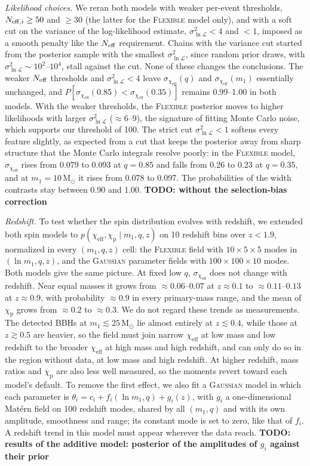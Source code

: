 \documentclass[%
 onecolumn,
 amsmath,amssymb,
 aps,
 prl,
 nofootinbib,nobibnotes,
]{revtex4-2}
\newcommand{\Msun}{\ensuremath{\mathrm{M}_{\odot}}}
\newcommand{\chieff}{\ensuremath{\chi_{\mathrm{eff}}}}
\newcommand{\chip}{\ensuremath{\chi_{\mathrm{p}}}}
\newcommand{\todo}[1]{{\color{Blue}\bf TODO: #1}}
\newcommand{\flexiblespins}{\textsc{Flexible}\xspace}
\newcommand{\gaussianspins}{\textsc{Gaussian}\xspace}
\begin{document}
\textit{Likelihood choices.} We reran both models with weaker per-event thresholds, $N_{{\rm eff}, i} \geq 50$ and $\geq 30$ (the latter for the \flexiblespins model only), and with a soft cut on the variance of the log-likelihood estimate, $\sigma^2_{\ln\mathcal{L}} < 4$ and $< 1$, imposed as a smooth penalty like the $N_{\rm eff}$ requirement. Chains with the variance cut started from the posterior sample with the smallest $\sigma^2_{\ln\mathcal{L}}$, since random prior draws, with $\sigma^2_{\ln\mathcal{L}} \sim 10^2$--$10^4$, stall against the cut. None of these changes the conclusions. The weaker $N_{\rm eff}$ thresholds and $\sigma^2_{\ln\mathcal{L}} < 4$ leave $\sigma_{\chieff}(q)$ and $\sigma_{\chieff}(m_1)$ essentially unchanged, and $P[\sigma_{\chieff}(0.85) < \sigma_{\chieff}(0.35)]$ remains 0.99--1.00 in both models. With the weaker thresholds, the \flexiblespins posterior moves to higher likelihoods with larger $\sigma^2_{\ln\mathcal{L}}$ ($\approx 6$--9), the signature of fitting Monte Carlo noise, which supports our threshold of 100. The strict cut $\sigma^2_{\ln\mathcal{L}} < 1$ softens every feature slightly, as expected from a cut that keeps the posterior away from sharp structure that the Monte Carlo integrals resolve poorly: in the \flexiblespins model, $\sigma_{\chieff}$ rises from 0.079 to 0.093 at $q = 0.85$ and falls from 0.26 to 0.23 at $q = 0.35$, and at $m_1 = 10\,\Msun$ it rises from 0.078 to 0.097. The probabilities of the width contrasts stay between 0.90 and 1.00. \todo{without the selection-bias correction}

\textit{Redshift.} To test whether the spin distribution evolves with redshift, we extended both spin models to $p(\chieff, \chip \mid m_1, q, z)$ on 10 redshift bins over $z < 1.9$, normalized in every $(m_1, q, z)$ cell: the \flexiblespins field with $10 \times 5 \times 5$ modes in $(\ln m_1, q, z)$, and the \gaussianspins parameter fields with $100 \times 100 \times 10$ modes. Both models give the same picture. At fixed low $q$, $\sigma_{\chieff}$ does not change with redshift. Near equal masses it grows from $\approx 0.06$--$0.07$ at $z \approx 0.1$ to $\approx 0.11$--$0.13$ at $z \approx 0.9$, with probability $\approx 0.9$ in every primary-mass range, and the mean of $\chip$ grows from $\approx 0.2$ to $\approx 0.3$. We do not regard these trends as measurements. The detected \acp{BBH} at $m_1 \lesssim 25\,\Msun$ lie almost entirely at $z \lesssim 0.4$, while those at $z \gtrsim 0.5$ are heavier, so the field must join narrow $\chieff$ at low mass and low redshift to the broader $\chieff$ at high mass and high redshift, and can only do so in the region without data, at low mass and high redshift. At higher redshift, mass ratios and $\chip$ are also less well measured, so the moments revert toward each model's default. To remove the first effect, we also fit a \gaussianspins model in which each parameter is $\theta_i = c_i + f_i(\ln m_1, q) + g_i(z)$, with $g_i$ a one-dimensional Mat\'ern field on 100 redshift modes, shared by all $(m_1, q)$ and with its own amplitude, smoothness and range; its constant mode is set to zero, like that of $f_i$. A redshift trend in this model must appear wherever the data reach. \todo{results of the additive model: posterior of the amplitudes of $g_i$ against their prior}
\end{document}
